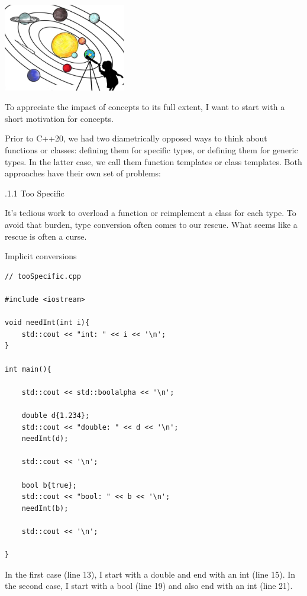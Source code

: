 
\begin{center}
\includegraphics[width=0.4\textwidth]{content/3/chapter4/images/2.png}\\
\end{center}

To appreciate the impact of concepts to its full extent, I want to start with a short motivation for concepts.


Prior to C++20, we had two diametrically opposed ways to think about functions or classes: defining them for specific types, or defining them for generic types. In the latter case, we call them function templates or class templates. Both approaches have their own set of problems:

.1.1\hspace{0.2cm} Too Specific

It’s tedious work to overload a function or reimplement a class for each type. To avoid that burden, type conversion often comes to our rescue. What seems like a rescue is often a curse.

\noindent
Implicit conversions
\begin{lstlisting}[style=styleCXX]
// tooSpecific.cpp

#include <iostream>

void needInt(int i){
	std::cout << "int: " << i << '\n';
}

int main(){

	std::cout << std::boolalpha << '\n';
	
	double d{1.234};
	std::cout << "double: " << d << '\n';
	needInt(d);
	
	std::cout << '\n';
	
	bool b{true};
	std::cout << "bool: " << b << '\n';
	needInt(b);
	
	std::cout << '\n';

}
\end{lstlisting}

In the first case (line 13), I start with a double and end with an int (line 15). In the second case, I start with a bool (line 19) and also end with an int (line 21).

